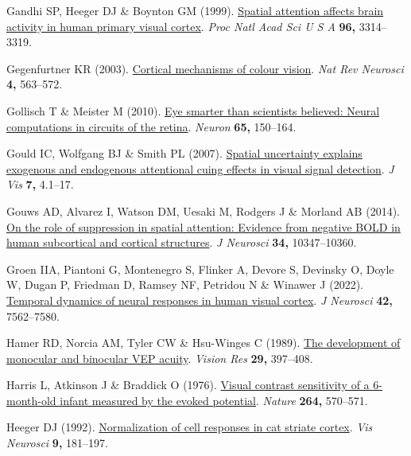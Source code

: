 \documentclass[
  letterpaper,
  DIV=11,
  numbers=noendperiod]{scrartcl}
\newlength{\cslhangindent}
\newenvironment{CSLReferences}[2] %
 {\begin{list}{}{%
  \setlength{\itemindent}{0pt}
  \setlength{\leftmargin}{0pt}
  \setlength{\parsep}{0pt}
  \ifodd #1
   \setlength{\leftmargin}{\cslhangindent}
   \setlength{\itemindent}{-1\cslhangindent}
  \fi
  \setlength{\itemsep}{#2\baselineskip}}}
 {\end{list}}
\begin{document}
\begin{CSLReferences}{1}{1}
Gandhi SP, Heeger DJ \& Boynton GM (1999).
\href{https://doi.org/10.1073/pnas.96.6.3314}{Spatial attention affects
brain activity in human primary visual cortex}. \emph{Proc Natl Acad Sci
U S A} \textbf{96,} 3314--3319.

Gegenfurtner KR (2003). \href{https://doi.org/10.1038/nrn1138}{Cortical
mechanisms of colour vision}. \emph{Nat Rev Neurosci} \textbf{4,}
563--572.

Gollisch T \& Meister M (2010).
\href{https://doi.org/10.1016/j.neuron.2009.12.009}{Eye smarter than
scientists believed: Neural computations in circuits of the retina}.
\emph{Neuron} \textbf{65,} 150--164.

Gould IC, Wolfgang BJ \& Smith PL (2007).
\href{https://doi.org/10.1167/7.13.4}{Spatial uncertainty explains
exogenous and endogenous attentional cuing effects in visual signal
detection}. \emph{J Vis} \textbf{7,} 4.1--17.

Gouws AD, Alvarez I, Watson DM, Uesaki M, Rodgers J \& Morland AB
(2014). \href{https://doi.org/10.1523/JNEUROSCI.0164-14.2014}{On the
role of suppression in spatial attention: Evidence from negative BOLD in
human subcortical and cortical structures}. \emph{J Neurosci}
\textbf{34,} 10347--10360.

Groen IIA, Piantoni G, Montenegro S, Flinker A, Devore S, Devinsky O,
Doyle W, Dugan P, Friedman D, Ramsey NF, Petridou N \& Winawer J (2022).
\href{https://doi.org/10.1523/JNEUROSCI.1812-21.2022}{Temporal dynamics
of neural responses in human visual cortex}. \emph{J Neurosci}
\textbf{42,} 7562--7580.

Hamer RD, Norcia AM, Tyler CW \& Hsu-Winges C (1989).
\href{https://doi.org/10.1016/0042-6989(89)90004-7}{The development of
monocular and binocular VEP acuity}. \emph{Vision Res} \textbf{29,}
397--408.

Harris L, Atkinson J \& Braddick O (1976).
\href{https://doi.org/10.1038/264570a0}{Visual contrast sensitivity of a
6-month-old infant measured by the evoked potential}. \emph{Nature}
\textbf{264,} 570--571.

Heeger DJ (1992).
\href{https://doi.org/10.1017/s0952523800009640}{Normalization of cell
responses in cat striate cortex}. \emph{Vis Neurosci} \textbf{9,}
181--197.


\end{CSLReferences}
\end{document}
